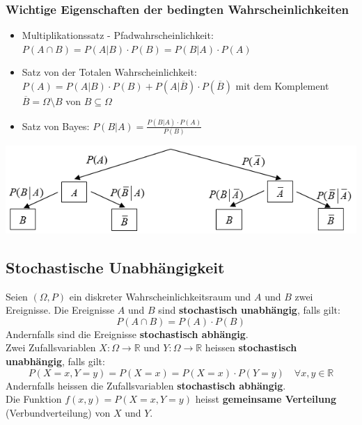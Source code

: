 \subsubsection{Wichtige Eigenschaften der bedingten Wahrscheinlichkeiten}
\label{sec:wichtige-eigenschaften-der-bedingten-wahrscheinlichkeiten}
\begin{itemize}
    \item Multiplikationssatz - Pfadwahrscheinlichkeit: $P(A \cap B) = P(A|B) \cdot P(B) = P(B|A) \cdot P(A)$
    \item Satz von der Totalen Wahrscheinlichkeit: $P(A) = P(A|B) \cdot P(B) + P(A|\overline{B}) \cdot P(\overline{B})$
        mit dem Komplement $\overline{B} = \Omega \setminus B$ von $B \subseteq \Omega$
    \item Satz von Bayes: $P(B|A) = \frac{P(B|A) \cdot P(A)}{P(B)}$
\end{itemize}
\begin{center}
    \includegraphics[width=1\textwidth]{images/Wahrscheinlichkeitsbaum.png}
\end{center}
\subsection{Stochastische Unabhängigkeit}
\label{sec:stochastische-unabhngigkeit}
Seien $(\Omega, P)$ ein diskreter Wahrscheinlichkeitsraum und $A$ und $B$ zwei Ereignisse.
Die Ereignisse $A$ und $B$ sind \textbf{stochastisch unabhängig}, falls gilt:
\begin{equation*}
    P(A \cap B) = P(A) \cdot P(B)
\end{equation*}
Andernfalls sind die Ereignisse \textbf{stochastisch abhängig}. \\
Zwei Zufallsvariablen $X: \Omega \rightarrow \mathbb{R}$ und $Y: \Omega \rightarrow \mathbb{R}$ 
heissen \textbf{stochastisch unabhängig}, falls gilt:
\begin{equation*}
    P(X=x, Y=y) = P(X=x) = P(X=x) \cdot P(Y=y) \quad \forall x, y \in \mathbb{R}
\end{equation*}
Andernfalls heissen die Zufallsvariablen \textbf{stochastisch abhängig}. \\
Die Funktion $f(x, y) = P(X=x, Y=y)$ heisst \textbf{gemeinsame Verteilung} (Verbundverteilung) von $X$ und $Y$.
